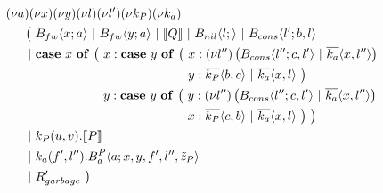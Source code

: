 
\begin{align*}
  &\anew{a}{\anew{x}{\anew{y}{\anew{l}{\anew{l'}{\anew{k_P}{\anew{k_a}{ \\
    &\hspace{0.5cm}
    \begin{aligned}[t]
      \big(\ &\ains{B_{fw}}{x}{a}
      \apar   \ains{B_{fw}}{y}{a}
      \apar   \encMJtoAP{Q}
      \apar   \ains{B_{nil}}{l}{}
      \apar   \ains{B_{cons}}{l'}{b, l}
      \\
      \apar
        &\begin{aligned}[t]
          \acse*{x}{\big(\ 
            &\aalt{x}{
              \begin{aligned}[t]
                \acse*{y}{\big(\ 
                  &\aalt{x}{\anew*{l''}{
                    \ains{B_{cons}}{l''}{c,l'} \apar \asnd{k_a}{x,l''}
                  }}\\
                  &\aalt{y}{
                    \asnd{k_P}{b,c} \apar \asnd{k_a}{x,l}
                  }\ 
                \big)}
              \end{aligned}
            }\\
            &\aalt{y}{
              \begin{aligned}[t]
                \acse*{y}{\big(\ 
                  &\aalt{y}{\anew*{l''}{
                    \ains{B_{cons}}{l''}{c,l'} \apar \asnd{k_a}{x,l''}
                  }}\\
                  &\aalt{x}{
                    \asnd{k_P}{c,b} \apar \asnd{k_a}{x,l}
                  }\ 
                \big)}
                \ \big)
              \end{aligned}
            }\ 
          }
        \end{aligned}
      \\
      \apar  &\arcv{k_P}{u,v} . \encMJtoAP{P}
      \\
      \apar  &\arcv{k_a}{f',l''} . \ains{B_a^P}{a}{x, y, f', l'',\tilde{z}_P}
      \\
      \apar  &R_{garbage}'
      \ \big)
    \end{aligned}
  }}}}}}}
\end{align*}

\TODO{1cm}{cases}


